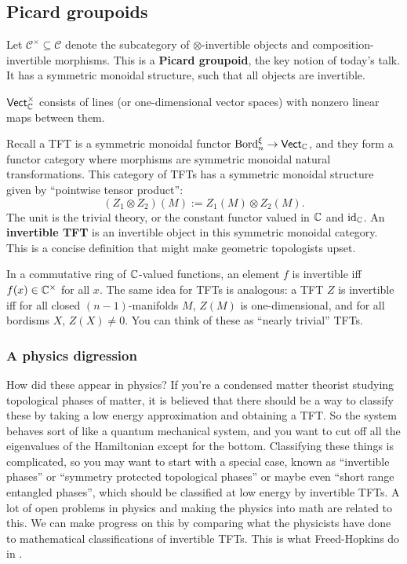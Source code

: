 \subsection*{Picard groupoids}
Let $\mathcal{C} ^{\times }\subseteq \mathcal{C} $ denote the subcategory of $\otimes$-invertible objects and composition-invertible morphisms. This is a \textbf{Picard groupoid}, the key notion of today's talk. It has a symmetric monoidal structure, such that all objects are invertible.

\begin{example}
    $\mathsf{Vect} _{\mathbb{C}}^{\times }$ consists of lines (or one-dimensional vector spaces) with nonzero linear maps between them.
\end{example}
Recall a TFT is a symmetric monoidal functor $\mathrm{Bord}_n ^{\xi}\to \mathsf{Vect} _{\mathbb{C}}$, and they form a functor category where morphisms are symmetric monoidal natural transformations. This category of TFTs has a symmetric monoidal structure given by ``pointwise tensor product'': \[
    (Z_1 \otimes Z_2)(M) := Z_1(M) \otimes Z_2(M).
\] The unit is the trivial theory, or the constant functor valued in $\mathbb{C}$ and $\operatorname{id}_{\mathbb{C}}$. An \textbf{invertible TFT} is an invertible object in this symmetric monoidal category. This is a concise definition that might make geometric topologists upset.

In a commutative ring of $\mathbb{C}$-valued functions, an element $f$ is invertible iff $f(x) \in \mathbb{C}^{\times }$ for all $x$. The same idea for TFTs is analogous: a TFT $Z$ is invertible iff for all closed $(n-1)$-manifolds $M$, $Z(M)$ is one-dimensional, and for all bordisms $X$, $Z(X)\neq 0$. You can think of these as ``nearly trivial'' TFTs.

\subsubsection*{A physics digression} 

How did these appear in physics? If you're a condensed matter theorist studying topological phases of matter, it is believed that there should be a way to classify these by taking a low energy approximation and obtaining a TFT. So the system behaves sort of like a quantum mechanical system, and you want to cut off all the eigenvalues of the Hamiltonian except for the bottom. Classifying these things is complicated, so you may want to start with a special case, known as ``invertible phases'' or ``symmetry protected topological phases'' or maybe even ``short range entangled phases'', which should be classified at low energy by invertible TFTs. A lot of open problems in physics and making the physics into math are related to this. We can make progress on this by comparing what the physicists have done to mathematical classifications of invertible TFTs. This is what Freed-Hopkins do in \cite{fh}.


